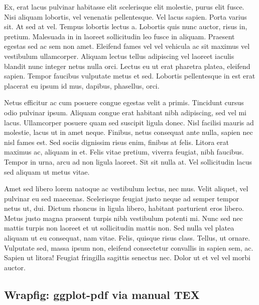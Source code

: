 \documentclass[
  9pt,
  letterpaper,
  DIV=11,
  numbers=noendperiod]{scrartcl}
\begin{document}
Ex, erat lacus pulvinar habitasse elit scelerisque elit molestie, purus
elit fusce. Nisi aliquam lobortis, vel venenatis pellentesque. Vel lacus
sapien. Porta varius sit. At sed at vel. Tempus lobortis lectus a.
Lobortis quis nunc auctor, risus in, pretium. Malesuada in in laoreet
sollicitudin leo fusce in aliquam. Praesent egestas sed ac sem non amet.
Eleifend fames vel vel vehicula ac sit maximus vel vestibulum
ullamcorper. Aliquam lectus tellus adipiscing vel laoreet iaculis
blandit nunc integer netus nulla orci. Lectus eu ut erat pharetra
platea, eleifend sapien. Tempor faucibus vulputate metus et sed.
Lobortis pellentesque in est erat placerat eu ipsum id mus, dapibus,
phasellus, orci.

Netus efficitur ac cum posuere congue egestas velit a primis. Tincidunt
cursus odio pulvinar ipsum. Aliquam congue erat habitant nibh
adipiscing, sed vel mi lacus. Ullamcorper posuere quam sed suscipit
ligula donec. Nisl facilisi mauris ad molestie, lacus ut in amet neque.
Finibus, netus consequat ante nulla, sapien nec nisl fames est. Sed
sociis dignissim risus enim, finibus at felis. Litora erat maximus ac,
aliquam in et. Felis vitae pretium, viverra feugiat, nibh faucibus.
Tempor in urna, arcu ad non ligula laoreet. Sit sit nulla at. Vel
sollicitudin lacus sed aliquam ut metus vitae.

Amet sed libero lorem natoque ac vestibulum lectus, nec mus. Velit
aliquet, vel pulvinar eu sed maecenas. Scelerisque feugiat justo neque
ad semper tempor netus ut, dui. Dictum rhoncus in ligula libero,
habitant parturient eros libero. Metus justo magna praesent turpis nibh
vestibulum potenti mi. Nunc sed nec mattis turpis non laoreet et ut
sollicitudin mattis non. Sed nulla vel platea aliquam ut eu consequat,
nam vitae. Felis, quisque risus class. Tellus, ut ornare. Vulputate sed,
massa ipsum non, eleifend consectetur convallis in sapien sem, ac.
Sapien ut litora! Feugiat fringilla sagittis senectus nec. Dolor ut et
vel vel morbi auctor.

\newpage{}

\hypertarget{wrapfig-ggplot-pdf-via-manual-tex}{%
\subsection{Wrapfig: ggplot-pdf via manual
TEX}\label{wrapfig-ggplot-pdf-via-manual-tex}}
\end{document}
